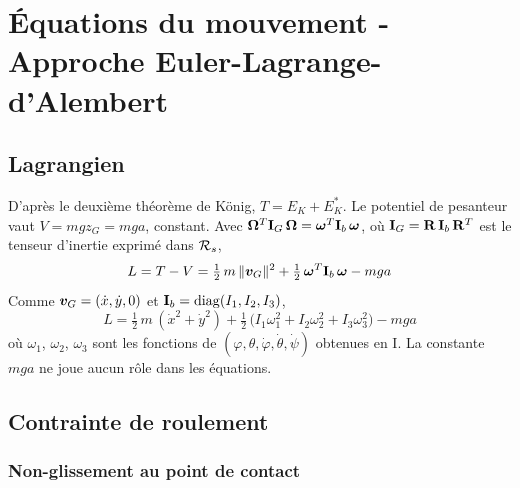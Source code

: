 
\section{Équations du mouvement - Approche Euler-Lagrange-d'Alembert}

\subsection{Lagrangien}

D'après le deuxième théorème de König, $T = E_K + E_K^*$. Le potentiel
de pesanteur vaut $V = m g z_G = m g a$, constant. Avec
$\bm{\Omega}^T\mathbf{I}_G\,\bm{\Omega} = \bm{\omega}^T\mathbf{I}_b\,
\bm{\omega}$, où $\mathbf{I}_G = \mathbf{R}\,\mathbf{I}_b\,\mathbf{R}^T$ est le
tenseur d'inertie exprimé dans $\mathcal{R}_{s}$,
\[
    L = T - V
    = \tfrac12\,m\,\|\bm{v}_G\|^2
    + \tfrac12\,\bm{\omega}^T\mathbf{I}_b\,\bm{\omega}
    - m g a
\]
Comme $\bm{v}_G = (\dot x,\dot y,0)$ et
$\mathbf{I}_b = \mathrm{diag}(I_1,I_2,I_3)$,
\[
    L = \tfrac12\,m\,(\dot x^2 + \dot y^2)
    + \tfrac12\,\bigl(I_1\omega_1^2 + I_2\omega_2^2
    + I_3\omega_3^2\bigr) - m g a
\]
où $\omega_1$, $\omega_2$, $\omega_3$ sont les fonctions de
$(\varphi,\theta,\dot\varphi,\dot\theta,\dot\psi)$ obtenues en I. La
constante $m g a$ ne joue aucun rôle dans les équations.


\subsection{Contrainte de roulement}

\subsubsection{Non-glissement au point de contact}

